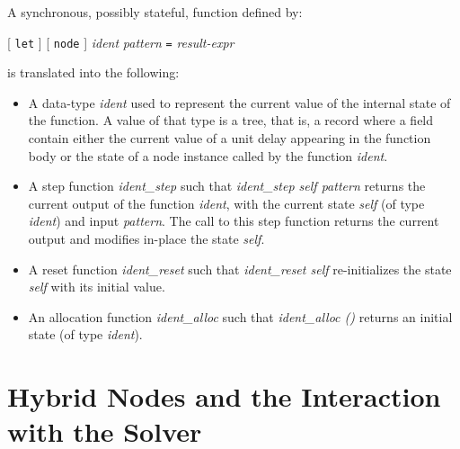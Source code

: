 \documentclass[11pt,titlepage,twoside]{report}
\newcommand{\term}[1]{{\tt #1}}
\newcommand{\nterm}[1]{{\em #1}}
\begin{document}
A synchronous, possibly stateful, function defined by:
\begin{center}
  [ \term{let} ] [ \term{node} ] \nterm{ident} \nterm{pattern} \term{=}
  \nterm{result-expr}
\end{center}
is translated into the following:
\begin{itemize}
\item
  A data-type \nterm{ident} used to represent the current value of the
  internal state of the function. A value of that type is a tree, that
  is, a record where a field contain either the current value of a unit delay
  appearing in the function body or the
  state of a node instance called by the function \nterm{ident}.
\item
  A step function \nterm{ident\_step} such that
    \nterm{ident\_step self pattern} returns the current output of the function
    \nterm{ident}, with the current state \nterm{self} (of type
    \nterm{ident}) and input \nterm{pattern}. The call to this step
    function returns the current output and modifies in-place
    the state \nterm{self}.
  \item
    A reset function \nterm{ident\_reset} such that \nterm{ident\_reset self}
    re-initializes the state \nterm{self} with its initial value.
  \item
    An allocation function \nterm{ident\_alloc} such that \nterm{ident\_alloc ()}
    returns an initial state (of type \nterm{ident}).
\end{itemize}

\section{Hybrid Nodes and the Interaction with the Solver\label{hybridnodes}} %
\end{document}

